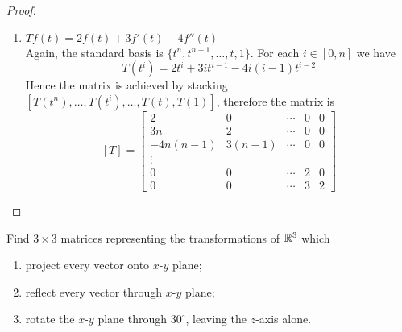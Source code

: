 \documentclass{article}
\def\by{\times}
\begin{document}
\begin{proof}
\begin{enumerate}
      \newpage
    \item $Tf(t)=2f(t)+3f'(t)-4f''(t)$\\
      Again, the standard basis is $\{t^n,t^{n-1},\dots,t,1\}$. For
      each $i\in [0,n]$ we have
      \[T(t^i)=2t^i+3it^{i-1}-4i(i-1)t^{i-2}\]
      Hence the matrix is achieved by stacking 
      $[T(t^n),\dots,T(t^i),\dots,T(t),T(1)]$, therefore the matrix is
      \[ [T]=
        \begin{bmatrix*}
          2        &0      &\cdots &0   &0\\
          3n       &2      &\cdots &0   &0\\
          -4n(n-1) &3(n-1) &\cdots &0   &0\\
          \vdots \\
          0        &0      &\cdots &2   &0\\
          0        &0      &\cdots &3   &2
        \end{bmatrix*}
      \]
  \end{enumerate}
\end{proof}
\begin{exercise}
  Find $3\by3$ matrices representing the transformations of $\R^3$ which
  \begin{enumerate}
    \item project every vector onto $x$-$y$ plane;
    \item reflect every vector through $x$-$y$ plane;
    \item rotate the $x$-$y$ plane through $30^\circ$, leaving the
      $z$-axis alone.
  \end{enumerate}
\end{exercise}
\end{document}
